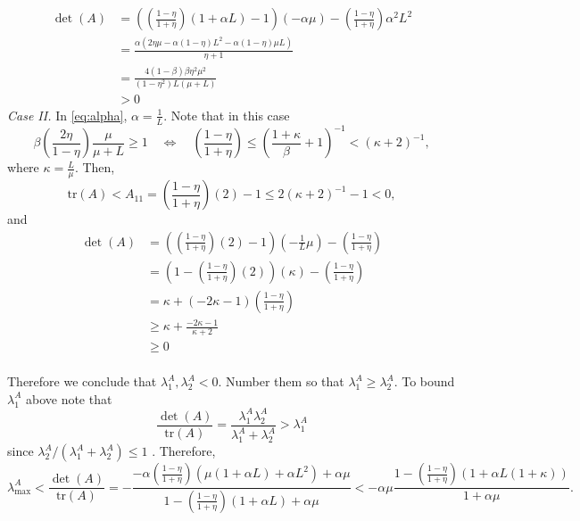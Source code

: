 \documentclass[11pt]{article}
\begin{document}
\begin{align*}
	 \det(A) &=((\frac{1-\eta}{1+\eta})(1+\alpha  L)-1)( -\alpha\mu ) -  (\frac{1-\eta}{1+\eta})\alpha^2 L^2\\
	 &=\frac{\alpha  \left(2 \eta  \mu -\alpha  (1-\eta ) L^2-\alpha  (1-\eta ) \mu  L\right)}{\eta +1} \\
	         &= \frac{4 (1-\beta ) \beta  \eta ^2 \mu ^2}{\left(1-\eta ^2\right) L (\mu +L)}\\
	         &> 0
\end{align*}	
\textit{Case II.} In \eqref{eq:alpha}, $\alpha = \frac{1}{L}$.  Note that in this case
\begin{equation}\label{eq:step}
  \beta\left(\frac{2 \eta}{1-\eta} \right)\frac{\mu}{\mu+L} \geq  1 \quad \Leftrightarrow \quad (\frac{1-\eta}{1+\eta}) \leq \left(\frac{1+\kappa}{\beta} + 1\right)^{-1} < \left(\kappa + 2 \right)^{-1},
\end{equation}
where $\kappa = \displaystyle\frac{L}{\mu}$.
Then,
\[
 \mbox{tr}(A) < A_{11} = (\frac{1-\eta}{1+\eta})(2)-1 \leq 2\left(\kappa + 2 \right)^{-1} - 1<0,
\]
and
\begin{align*}
 \det(A) &= ((\frac{1-\eta}{1+\eta})(2)-1)( -\frac{1}{L}\mu ) -  (\frac{1-\eta}{1+\eta})\\
         &= (1-(\frac{1-\eta}{1+\eta})(2))( \kappa) -  (\frac{1-\eta}{1+\eta})\\
         &= \kappa + (-2\kappa -  1)(\frac{1-\eta}{1+\eta})\\
         &\geq  \kappa + \frac{-2\kappa -  1}{\kappa + 2}\\
         &\geq 0\\
\end{align*}

\bigskip

Therefore we conclude that $\lambda^A_1,\lambda^A_2<0$. 
Number them so that $\lambda^A_1 \geq \lambda^A_2$.
To bound  $\lambda^A_1$ above note that
\[
	\frac{\det(A)}{\mbox{tr}(A)} =\frac{ \lambda^A_1 \lambda^A_2} {\lambda^A_1 + \lambda^A_2} > \lambda^A_1
\]	
since $ \lambda^A_2 /  ( \lambda^A_1 + \lambda^A_2 )\leq 1$ .
%
Therefore,
\begin{equation}\label{eq:lambdaA}
 \lambda_{\max}^A < \frac{\det(A)}{\mbox{tr}(A)} = -\frac{-\alpha(\frac{1-\eta}{1+\eta})(\mu(1+\alpha L)+\alpha L^2)+\alpha\mu}{1-(\frac{1-\eta}{1+\eta})(1+\alpha  L)+\alpha\mu} < -\alpha\mu\frac{1-(\frac{1-\eta}{1+\eta})(1+\alpha L(1+\kappa))}{1+\alpha\mu}. 
\end{equation}
\end{document}
